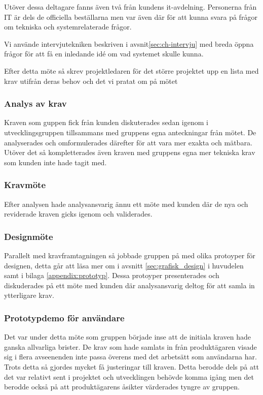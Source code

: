Utöver dessa deltagare fanns även två från kundens it-avdelning. Personerna från IT är dels de officiella beställarna men var även där för att kunna svara på frågor om tekniska och systemrelaterade frågor.

Vi använde intervjutekniken beskriven i avsnit\ref{sec:ch-intervju} med breda öppna frågor för att få en inledande idé om vad systemet skulle kunna. 

Efter detta möte så skrev projektledaren för det större projektet upp en lista med krav utifrån deras behov och det vi pratat om på mötet

\subsubsection{Analys av krav}
Kraven som guppen fick från kunden diskuterades sedan igenom i utvecklingsgruppen tillsammans med gruppens egna anteckningar från mötet. De analyserades och omformulerades därefter för att vara mer exakta och mätbara. Utöver det så kompletterades även kraven med gruppens egna mer tekniska krav som kunden inte hade tagit med.

\subsubsection{Kravmöte}
Efter analysen hade analysansvarig ännu ett möte med kunden där de nya och reviderade kraven gicks igenom och validerades.

\subsubsection{Designmöte}
Parallelt med kravframtagningen så jobbade gruppen på med olika protoyper för designen, detta går att läsa mer om i avsnitt \ref{sec:grafisk_design} i huvudelen samt i bilaga \ref{appendix:prototyp}.
Dessa protoyper presenterades och diskuderades på ett möte med kunden där analysansvarig deltog för att samla in ytterligare krav.

\subsubsection{Prototypdemo för användare}
Det var under detta möte som gruppen började inse att de initiala kraven hade ganska allvarliga brister. De krav som hade samlats in från produktägaren visade sig i flera avseenenden inte passa överens med det arbetsätt som användarna har. Trots detta så gjordes mycket få justeringar till kraven. Detta berodde dels på att det var relativt sent i projektet och utvecklingen behövde komma igång men det berodde också på att produktägarens åsikter värderades tyngre av gruppen.

